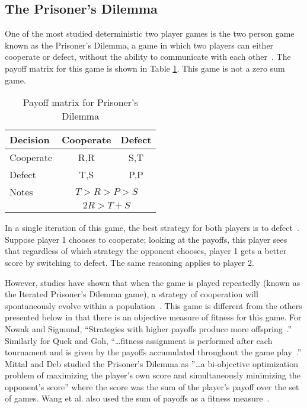\subsection{The Prisoner's Dilemma}

One of the most studied deterministic two player games is the two person game
known as the Prisoner's Dilemma, a game in which two players can either
cooperate or defect, without the ability to communicate with each
other~\cite{Flood1958,Nowak1993,Mittal2009}. The payoff matrix for this game is
shown in Table \ref{table-pdpayoff}. This game is not a zero sum game.

\begin{table}[h]
\caption{Payoff matrix for Prisoner's Dilemma}
\begin{center}
\begin{tabular}{|l|c|c|}
\hline
\multicolumn{1}{|l|}{{Decision\!}}
& \multicolumn{1}{|c|}{Cooperate}
& \multicolumn{1}{|c|}{Defect} \\ \hline
Cooperate &  R,R & S,T \\ \hline 
Defect    &  T,S & P,P  \\ \hline \hline
Notes & \multicolumn{2}{|c|}{\(T > R > P > S\)} \\ 
      & \multicolumn{2}{|c|}{\(2R > T + S\)} \\ \hline
\end{tabular}
\label{table-pdpayoff}
\end{center}
\end{table}


In a single iteration of this game, the best strategy for both players is to
defect~\cite{nash50,Nash1951}. Suppose player 1 chooses to cooperate;
looking at the payoffs, this player sees that regardless of which strategy the
opponent chooses, player 1 gets a better score by switching to defect. The same
reasoning applies to player 2.

However, studies have shown that when the game is played repeatedly (known as
the Iterated Prisoner's Dilemma game), a strategy of cooperation will
spontaneously evolve within a
population~\cite{Axelrod1984,Nowak1993,DBLP:conf/cig/QuekG07,Mittal2009,WangTao2010}.
This game is different from the others presented below in that there is an
objective measure of fitness for this game. For Nowak and Sigmund, ``Strategies
with higher payoffs produce more offspring~\cite{Nowak1993}.'' Similarly for
Quek and Goh, ``\ldots fitness assignment is performed after each tournament and
is given by the payoffs accumulated throughout the game
play~\cite{DBLP:conf/cig/QuekG07}.'' Mittal and Deb studied the Prisoner's
Dilemma as ''\ldots a bi-objective optimization problem of maximizing the
player's own score and simultaneously minimizing the opponent's score'' where
the score was the sum of the player's payoff over the set of games. Wang et al.
also used the sum of payoffs as a fitness measure~\cite{WangTao2010}.

